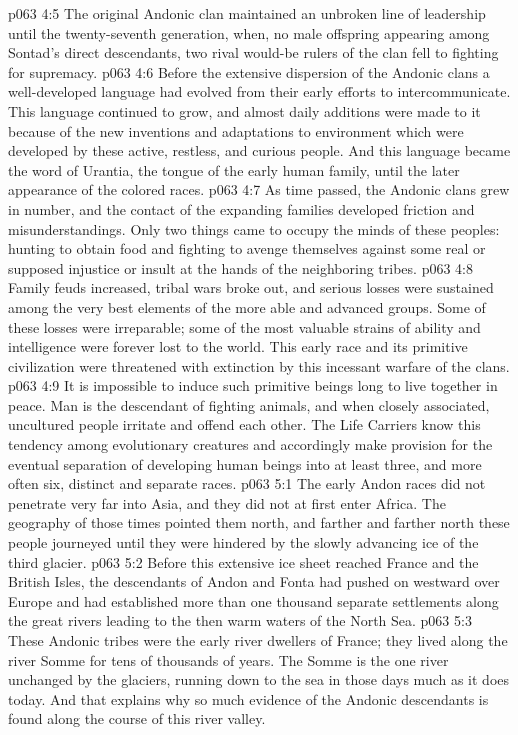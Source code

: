 \pc \vs p063 4:5 The original Andonic clan maintained an unbroken line of leadership until the twenty\hyp{}seventh generation, when, no male offspring appearing among Sontad’s direct descendants, two rival would\hyp{}be rulers of the clan fell to fighting for supremacy.
\vs p063 4:6 Before the extensive dispersion of the Andonic clans a well\hyp{}developed language had evolved from their early efforts to intercommunicate. This language continued to grow, and almost daily additions were made to it because of the new inventions and adaptations to environment which were developed by these active, restless, and curious people. And this language became the word of Urantia, the tongue of the early human family, until the later appearance of the colored races.
\pc \vs p063 4:7 As time passed, the Andonic clans grew in number, and the contact of the expanding families developed friction and misunderstandings. Only two things came to occupy the minds of these peoples: hunting to obtain food and fighting to avenge themselves against some real or supposed injustice or insult at the hands of the neighboring tribes.
\vs p063 4:8 Family feuds increased, tribal wars broke out, and serious losses were sustained among the very best elements of the more able and advanced groups. Some of these losses were irreparable; some of the most valuable strains of ability and intelligence were forever lost to the world. This early race and its primitive civilization were threatened with extinction by this incessant warfare of the clans.
\vs p063 4:9 It is impossible to induce such primitive beings long to live together in peace. Man is the descendant of fighting animals, and when closely associated, uncultured people irritate and offend each other. The Life Carriers know this tendency among evolutionary creatures and accordingly make provision for the eventual separation of developing human beings into at least three, and more often six, distinct and separate races.
\vs p063 5:1 The early Andon races did not penetrate very far into Asia, and they did not at first enter Africa. The geography of those times pointed them north, and farther and farther north these people journeyed until they were hindered by the slowly advancing ice of the third glacier.
\vs p063 5:2 Before this extensive ice sheet reached France and the British Isles, the descendants of Andon and Fonta had pushed on westward over Europe and had established more than one thousand separate settlements along the great rivers leading to the then warm waters of the North Sea.
\vs p063 5:3 These Andonic tribes were the early river dwellers of France; they lived along the river Somme for tens of thousands of years. The Somme is the one river unchanged by the glaciers, running down to the sea in those days much as it does today. And that explains why so much evidence of the Andonic descendants is found along the course of this river valley.
